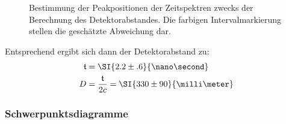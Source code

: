 \documentclass[slug=PET, room=Andreas-Schubert-Bau\,\ 424A, supervisor=Carsten\ Bittrich, coursedate=10.\ 01.\ 2020]{../../Lab_Report_LaTeX/lab_report}
\begin{document}
\begin{figure}[H]\centering
  
  \caption[Abstandsbestimmung]{Bestimmung der Peakpositionen der Zeitspektren zwecks der
    Berechnung des Detektorabstandes. Die farbigen Intervalmarkierung
    stellen die gesch\"atzte Abweichung dar.}
  \label{fig:calibration-lenght_det}
\end{figure}

Entsprechend ergibt sich dann der Detektorabstand zu:
\begin{align}
  \label{eq:abst}
  \mathfrak{t} &= \SI{2.2\pm .6}{\nano\second} \\
  D &= \frac{\mathfrak{t}}{2c} = \SI{330\pm 90}{\milli\meter}
\end{align}

\subsubsection{Schwerpunktsdiagramme}
\label{sec:schwpkt}
\end{document}
